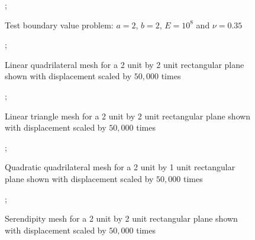\documentclass{article}
\begin{document}
\begin{figure}
    ;
    \caption{Test boundary value problem: $a = 2$, $b = 2$, $E = 10^8$ and $\nu = 0.35$}
\centering
\end{figure}

\begin{figure}
    ;
    \caption{Linear quadrilateral mesh for a 2 unit by 2 unit rectangular plane shown with displacement scaled by $50,000$ times}
\centering
\end{figure}

\begin{figure}
    ;
    \caption{Linear triangle mesh for a 2 unit by 2 unit rectangular plane shown with displacement scaled by $50,000$ times}
\centering
\end{figure}

\begin{figure}
    ;
    \caption{Quadratic quadrilateral mesh for a 2 unit by 1 unit rectangular plane shown with displacement scaled by $50,000$ times}
\centering
\end{figure}


\begin{figure}
    ;
    \caption{Serendipity mesh for a 2 unit by 2 unit rectangular plane shown with displacement scaled by $50,000$ times}
\centering
\end{figure}
\end{document}
